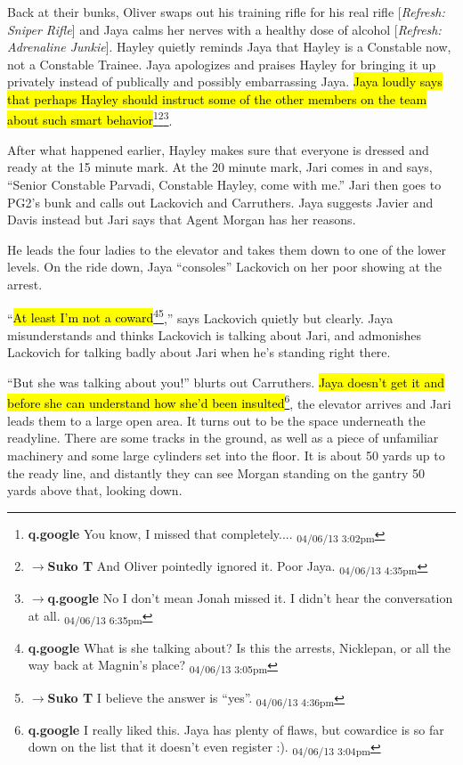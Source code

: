 Back at their bunks, Oliver swaps out his training rifle for his real rifle {[}\textit{Refresh: Sniper Rifle}{]} and Jaya calms her nerves with a healthy dose of alcohol {[}\textit{Refresh: Adrenaline Junkie}{]}.  Hayley quietly reminds Jaya that Hayley is a Constable now, not a Constable Trainee.  Jaya apologizes and praises Hayley for bringing it up privately instead of publically and possibly embarrassing Jaya. \hl{Jaya loudly says that perhaps Hayley should instruct some of the other members on the team about such smart behavior}\footnote{\textbf{q.google }You know, I missed that completely.... \textsubscript{04/06/13 3:02pm}}\footnote{$\rightarrow$\textbf{Suko T }And Oliver pointedly ignored it.  Poor Jaya. \textsubscript{04/06/13 4:35pm}}\footnote{$\rightarrow$\textbf{q.google }No I don't mean Jonah missed it.  I didn't hear the conversation at all. \textsubscript{04/06/13 6:35pm}}.

\newpage
{}

After what happened earlier, Hayley makes sure that everyone is dressed and ready at the 15 minute mark.  At the 20 minute mark, Jari comes in and says, ``Senior Constable Parvadi, Constable Hayley, come with me.''  Jari then goes to PG2's bunk and calls out Lackovich and Carruthers.  Jaya suggests Javier and Davis instead but Jari says that Agent Morgan has her reasons.



He leads the four ladies to the elevator and takes them down to one of the lower levels.  On the ride down, Jaya ``consoles'' Lackovich on her poor showing at the arrest.  

``\hl{At least I'm not a coward}\footnote{\textbf{q.google }What is she talking about?  Is this the arrests, Nicklepan, or all the way back at Magnin's place? \textsubscript{04/06/13 3:05pm}}\footnote{$\rightarrow$\textbf{Suko T }I believe the answer is ``yes''. \textsubscript{04/06/13 4:36pm}},'' says Lackovich quietly but clearly.  Jaya misunderstands and thinks Lackovich is talking about Jari, and admonishes Lackovich for talking badly about Jari when he's standing right there.  

``But she was talking about you!'' blurts out Carruthers.  \hl{Jaya doesn't get it and before she can understand how she'd been insulted}\footnote{\textbf{q.google }I really liked this.  Jaya has plenty of flaws, but cowardice is so far down on the list that it doesn't even register :). \textsubscript{04/06/13 3:04pm}}, the elevator arrives and Jari leads them to a large open area.  It turns out to be the space underneath the readyline.  There are some tracks in the ground, as well as a piece of unfamiliar machinery and some large cylinders set into the floor.   It is about 50 yards up to the ready line, and distantly they can see Morgan standing on the gantry 50 yards above that, looking down.



